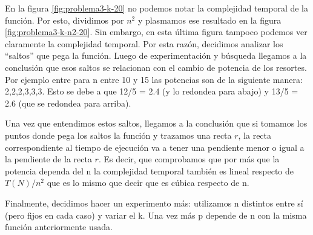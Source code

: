 En la figura \ref{fig:problema3-k-20} no podemos notar la complejidad temporal de la función. Por esto, dividimos por $n^2$ y plasmamos ese resultado en la figura \ref{fig:problema3-k-n2-20}. Sin embargo, en esta última figura tampoco podemos ver claramente la complejidad temporal. Por esta razón, decidimos analizar los ``saltos'' que pega la función. Luego de experimentación y búsqueda llegamos a la conclusión que esos saltos se relacionan con el cambio de potencia de los resortes. Por ejemplo entre para n entre 10 y 15 las potencias son de la siguiente manera: 2,2,2,3,3,3. Esto se debe a que 12/5 = 2.4 (y lo redondea para abajo) y 13/5 = 2.6 (que se redondea para arriba).

Una vez que entendimos estos saltos, llegamos a la conclusión que si tomamos los puntos donde pega los saltos la función y trazamos una recta $r$, la recta correspondiente al tiempo de ejecución va a tener una pendiente menor o igual a la pendiente de la recta $r$. Es decir, que comprobamos que por más que la potencia dependa del n la complejidad temporal también es lineal respecto de $T(N)/n^2$ que es lo mismo que decir que es cúbica respecto de n.

Finalmente, decidimos hacer un experimento más: utilizamos n distintos entre sí (pero fijos en cada caso) y variar el k. Una vez más p depende de n con la misma función anteriormente usada.

